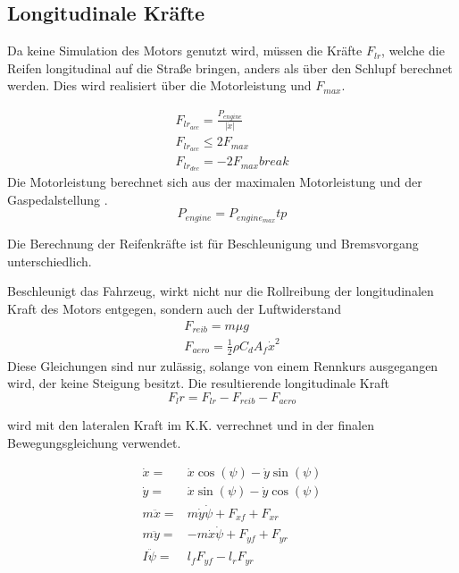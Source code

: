 \documentclass{like}
\begin{document}
\subsection*{Longitudinale Kräfte}
Da keine Simulation des Motors genutzt wird, müssen die Kräfte \(F_{lr}\), welche die Reifen longitudinal auf die Straße bringen, anders als über den Schlupf berechnet werden.
Dies wird realisiert über die Motorleistung und \(F_{max}\).

\begin{eqnarray}
F_{lr_{acc}} = \frac{P_{engine}}{|\dot{x}|} \label{long_dyn_engine}\\
F_{lr_{acc}}\leq 2 F_{max} \label{long_dyn_max}\\
F_{lr_{dec}} = - 2 F_{max}  break
\end{eqnarray}
Die Motorleistung berechnet sich aus der maximalen Motorleistung und der Gaspedalstellung .
\begin{equation}
	P_{engine} = P_{engine_{max}} tp
\end{equation}

Die Berechnung der Reifenkräfte ist für Beschleunigung und Bremsvorgang unterschiedlich.

Beschleunigt das Fahrzeug, wirkt nicht nur die Rollreibung der longitudinalen Kraft des Motors entgegen, sondern auch der Luftwiderstand
\begin{eqnarray}
F_{reib} = m \mu g \\
F_{aero} = \frac{1}{2} \rho C_d A_f \dot{x}^2
\end{eqnarray}
Diese Gleichungen sind nur zulässig, solange von einem Rennkurs ausgegangen wird, der keine Steigung besitzt. Die resultierende longitudinale Kraft 
\begin{equation}
F_lr = F_{lr} - F_{reib} - F_{aero}
\end{equation}

wird mit den lateralen Kraft im \ac{K.K.} verrechnet und in der finalen Bewegungsgleichung verwendet.

\begin{eqnarray}
\dot{x} =& \dot{x} \cos(\psi) - \dot{y} \sin(\psi) \\
\dot{y} =& \dot{x} \sin(\psi) - \dot{y} \cos(\psi) \\
m \ddot{x} =& m \dot{y} \dot{\psi} + F_{xf} +  F_{xr}\\
m \ddot{y} =& - m \dot{x} \dot{\psi} +  F_{yf} +  F_{yr} \\
I \ddot{\psi} =&  l_f F_{yf} -  l_r F_{yr} 
\end{eqnarray}
\end{document}
